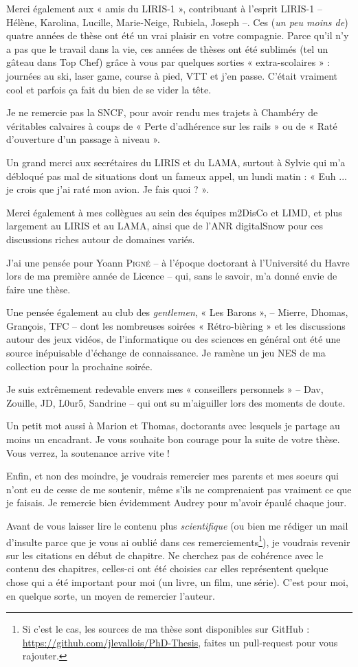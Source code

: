 Merci également aux « amis du LIRIS-1 », contribuant à l'esprit LIRIS-1 --
Hélène, Karolina, Lucille, Marie-Neige, Rubiela, Joseph --. Ces (\emph{un peu
moins de}) quatre années de thèse ont été un vrai plaisir en votre compagnie.
Parce qu'il n'y a pas que le travail dans la vie, ces années de thèses ont été
sublimés (tel un gâteau dans Top Chef) grâce à vous par quelques sorties «
extra-scolaires » : journées au ski, laser game, course à pied, VTT et j'en
passe. C'était vraiment cool et parfois ça fait du bien de se vider la tête.

Je ne remercie pas la SNCF, pour avoir rendu mes trajets à Chambéry de
véritables calvaires à coups de « Perte d'adhérence sur les rails » ou de «
Raté d'ouverture d'un passage à niveau ».

Un grand merci aux secrétaires du LIRIS et du LAMA, surtout à Sylvie qui m'a
débloqué pas mal de situations dont un fameux appel, un lundi matin : «
Euh ... je crois que j'ai raté mon avion. Je fais quoi ? ».

Merci également à mes collègues au sein des équipes m2DisCo et LIMD, et plus
largement au LIRIS et au LAMA, ainsi que de l'ANR digitalSnow pour ces
discussions riches autour de domaines variés.

J'ai une pensée pour Yoann \textsc{Pigné} -- à l'époque doctorant à l'Université
du Havre lors de ma première année de Licence -- qui, sans le savoir, m'a donné
envie de faire une thèse.

Une pensée également au club des \emph{gentlemen}, « Les Barons », -- Mierre,
Dhomas, Grançois, TFC -- dont les nombreuses soirées « Rétro-bièring » et les
discussions autour des jeux vidéos, de l'informatique ou des sciences en général
ont été une source inépuisable d'échange de connaissance. Je ramène un jeu NES
de ma collection pour la prochaine soirée.

Je suis extrêmement redevable envers mes « conseillers personnels » -- Dav,
 Zouille, JD, L0ur5, Sandrine -- qui ont su m'aiguiller lors des
moments de doute.

Un petit mot aussi à Marion et Thomas, doctorants avec lesquels je partage au
moins un encadrant. Je vous souhaite bon courage pour la suite de votre thèse.
Vous verrez, la soutenance arrive vite !

Enfin, et non des moindre, je voudrais remercier mes parents et mes soeurs qui
n'ont eu de cesse de me soutenir, même s'ils ne comprenaient pas vraiment ce que
je faisais. Je remercie bien évidemment Audrey pour m'avoir épaulé chaque jour.

Avant de vous laisser lire le contenu plus \emph{scientifique} (ou bien me
rédiger un mail d'insulte parce que je vous ai oublié dans ces
remerciements\footnote{Si c'est le cas, les sources de ma thèse sont disponibles
sur GitHub : \url{https://github.com/jlevallois/PhD-Thesis}, faites un
pull-request pour vous rajouter.}), je voudrais revenir sur les citations en
début de chapitre. Ne cherchez pas de cohérence avec le contenu des chapitres,
celles-ci ont été choisies car elles représentent quelque chose qui a été
important pour moi (un livre, un film, une série). C'est pour moi, en quelque
sorte, un moyen de remercier l'auteur.
